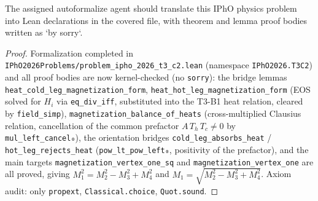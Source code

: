 \begin{theorem}
\label{thm:physics:ipho_2026_t3_c2:target}
\leanok
The assigned autoformalize agent should translate this IPhO physics problem into Lean declarations in the covered file, with theorem and lemma proof bodies written as `by sorry`.
\end{theorem}
\begin{proof}
\leanok
Formalization completed in \texttt{IPhO2026Problems/problem\_ipho\_2026\_t3\_c2.lean}
(namespace \texttt{IPhO2026.T3C2}) and all proof bodies are now kernel-checked
(no \texttt{sorry}): the bridge lemmas
\texttt{heat\_cold\_leg\_magnetization\_form},
\texttt{heat\_hot\_leg\_magnetization\_form} (EOS solved for $H_i$ via
\texttt{eq\_div\_iff}, substituted into the T3-B1 heat relation, cleared by
\texttt{field\_simp}), \texttt{magnetization\_balance\_of\_heats}
(cross-multiplied Clausius relation, cancellation of the common prefactor
$A\,T_h\,T_c \neq 0$ by \texttt{mul\_left\_cancel₀}), the orientation bridges
\texttt{cold\_leg\_absorbs\_heat} / \texttt{hot\_leg\_rejects\_heat}
(\texttt{pow\_lt\_pow\_left₀}, positivity of the prefactor), and the main
targets \texttt{magnetization\_vertex\_one\_sq} and
\texttt{magnetization\_vertex\_one} are all proved, giving
$M_1^2 = M_2^2 - M_3^2 + M_4^2$ and $M_1 = \sqrt{M_2^2 - M_3^2 + M_4^2}$.
Axiom audit: only \texttt{propext}, \texttt{Classical.choice},
\texttt{Quot.sound}.
\end{proof}

